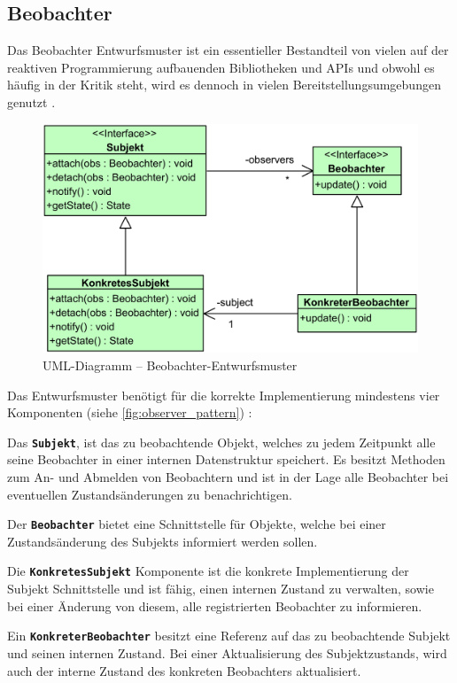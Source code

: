 \subsection{Beobachter}
Das Beobachter Entwurfsmuster ist ein essentieller Bestandteil von vielen auf der reaktiven Programmierung aufbauenden Bibliotheken und APIs \cite{Salvaneschi2015} und obwohl es häufig in der Kritik steht, wird es dennoch in vielen Bereitstellungsumgebungen genutzt \cite{Maier2010}.
\begin{figure}[H]
	\includegraphics[width=\textwidth]{Abbildungen/Observer Pattern.png}
	\caption{UML-Diagramm -- Beobachter-Entwurfsmuster}
	\label{fig:observer_pattern}
\end{figure}
\noindent Das Entwurfsmuster benötigt für die korrekte Implementierung mindestens vier Komponenten (siehe \autoref{fig:observer_pattern}) \cite{Gamma1993}:
\begin{description}
	\item Das \texttt{\textbf{Subjekt}}, ist das zu beobachtende Objekt, welches zu jedem Zeitpunkt alle seine Beobachter in einer internen Datenstruktur speichert. Es besitzt Methoden zum An- und Abmelden von Beobachtern und ist in der Lage alle Beobachter bei eventuellen Zustandsänderungen zu benachrichtigen.
	\item Der \texttt{\textbf{Beobachter}} bietet eine Schnittstelle für Objekte, welche bei einer Zustandsänderung des Subjekts informiert werden sollen.
	\item Die \texttt{\textbf{KonkretesSubjekt}} Komponente ist die konkrete Implementierung der Subjekt Schnittstelle und ist fähig, einen internen Zustand zu verwalten, sowie bei einer Änderung von diesem, alle registrierten Beobachter zu informieren.
	\item Ein \texttt{\textbf{KonkreterBeobachter}} besitzt eine Referenz auf das zu beobachtende Subjekt und seinen internen Zustand. Bei einer Aktualisierung des Subjektzustands, wird auch der interne Zustand des konkreten Beobachters aktualisiert.
\end{description}
\newpage

